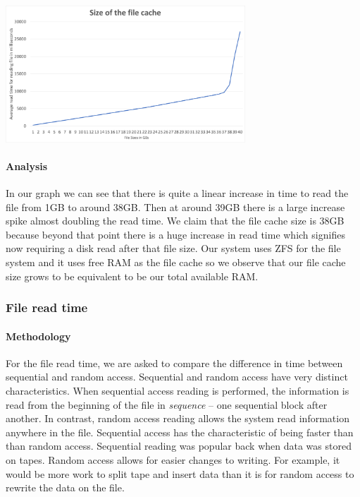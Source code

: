 \includegraphics[width=9cm]{size_file_cache.png}

\paragraph{Analysis}

In our graph we can see that there is quite a linear increase in time to read the file from 1GB to around 38GB. Then at around 39GB there is a large increase spike almost doubling the read time. We claim that the file cache size is 38GB because beyond that point there is a huge increase in read time which signifies now requiring a disk read after that file size. Our system uses ZFS for the file system and it uses free RAM as the file cache so we observe that our file cache size grows to be equivalent to be our total available RAM.

\subsubsection{File read time} 


\paragraph{Methodology}

For the file read time, we are asked to compare the difference in time between sequential and random access. Sequential and random access have very distinct characteristics. When sequential access reading is performed, the information is read from the beginning of the file in \emph{sequence} -- one sequential block after another. In contrast, random access reading allows the system read information anywhere in the file. Sequential access has the characteristic of being faster than than random access. Sequential reading was popular back when data was stored on tapes. Random access allows for easier changes to writing. For example, it would be more work to split tape and insert data than it is for random access to rewrite the data on the file.

